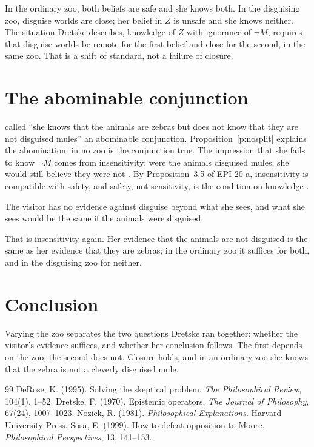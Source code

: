 \documentclass{situationist-preprint}
\begin{document}
In the ordinary zoo, both beliefs are safe and she knows both. In the disguising zoo, disguise worlds are close; her belief in $Z$ is unsafe and she knows neither. The situation Dretske describes, knowledge of $Z$ with ignorance of $\neg M$, requires that disguise worlds be remote for the first belief and close for the second, in the same zoo. That is a shift of standard, not a failure of closure.

\section{The abominable conjunction}

\citet{DeRose1995} called \enquote{she knows that the animals are zebras but does not know that they are not disguised mules} an abominable conjunction. Proposition~\ref{p:nosplit} explains the abomination: in no zoo is the conjunction true. The impression that she fails to know $\neg M$ comes from insensitivity: were the animals disguised mules, she would still believe they were not \citep{Nozick1981}. By Proposition~3.5 of EPI-20-a, insensitivity is compatible with safety, and safety, not sensitivity, is the condition on knowledge \citep{Sosa1999}.

\begin{objection}
The visitor has no evidence against disguise beyond what she sees, and what she sees would be the same if the animals were disguised.
\end{objection}

\begin{reply}
That is insensitivity again. Her evidence that the animals are not disguised is the same as her evidence that they are zebras; in the ordinary zoo it suffices for both, and in the disguising zoo for neither.
\end{reply}

\section{Conclusion}

Varying the zoo separates the two questions Dretske ran together: whether the visitor's evidence suffices, and whether her conclusion follows. The first depends on the zoo; the second does not. Closure holds, and in an ordinary zoo she knows that the zebra is not a cleverly disguised mule.

\begin{thebibliography}{99}\small
{} DeRose, K. (1995). Solving the skeptical problem. \emph{The Philosophical Review}, 104(1), 1--52.
 Dretske, F. (1970). Epistemic operators. \emph{The Journal of Philosophy}, 67(24), 1007--1023.
 Nozick, R. (1981). \emph{Philosophical Explanations}. Harvard University Press.
 Sosa, E. (1999). How to defeat opposition to Moore. \emph{Philosophical Perspectives}, 13, 141--153.
\end{thebibliography}
\end{document}
